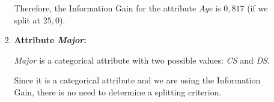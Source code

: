 \documentclass[
english,
smallborders
]{i6prcsht}
\begin{document}
\begin{solution}
\begin{enumerate}
\begin{enumerate}
\begin{enumerate}
\begin{enumerate}
				                  \end{enumerate}
				                  
				                  Therefore, the Information Gain for the attribute \textit{Age} is $0,817$ (if we split at $25,0$).
				                  
				            \item \textbf{Attribute \textit{Major}:}
				                  
				                  \textit{Major} is a categorical attribute with two possible values: \textit{CS} and \textit{DS}.
				                  
				                  Since it is a categorical attribute and we are using the Information Gain, there is no need to determine a splitting criterion.
				                  

\end{enumerate}
\end{enumerate}
\end{enumerate}
\end{solution}
\end{document}
